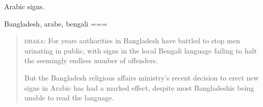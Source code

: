 Arabic signs.

Bangladesh, arabe, bengali
===
\begin{quote}
\textsc{dhaka}: For years authorities in Bangladesh have battled to stop men urinating in public, with signs in the local Bengali language failing to halt the seemingly endless number of offenders.

But the Bangladesh religious affairs ministry's recent decision to erect new signs in Arabic has had a marked effect, despite most Bangladeshis being unable to read the language.
\end{quote}
\nocite{2015b}
